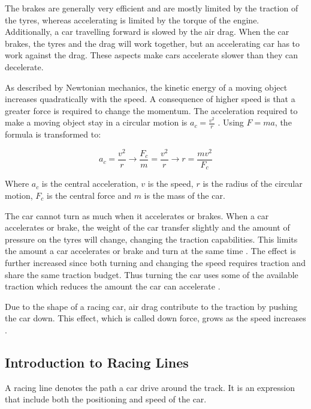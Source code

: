 The brakes are generally very efficient and are mostly limited by the traction of the tyres, whereas accelerating is limited by the torque of the engine. Additionally, a car travelling forward is slowed by the air drag. When the car brakes, the tyres and the drag will work together, but an accelerating car has to work against the drag. These aspects make cars accelerate slower than they can decelerate.

As described by Newtonian mechanics, the kinetic energy of a moving object increases quadratically with the speed. A consequence of higher speed is that a greater force is required to change the momentum. The acceleration required to make a moving object stay in a circular motion is \(a_c=\frac{v^2}{r}\)  \cite{beckman}. Using \(F=ma\), the formula is transformed to: 

\begin{equation}
\label{equation:turn_radius}
a_c = \frac{v^2}{r} 
\rightarrow
\frac{F_c}{m} = \frac{v^2}{r} 
\rightarrow
r = \frac{mv^2}{F_c}
\end{equation}

\noindent
Where $a_c$ is the central acceleration, $v$ is the speed, $r$ is the radius of the circular motion, $F_c$ is the central force and $m$ is the mass of the car. 

The car cannot turn as much when it accelerates or brakes. When a car accelerates or brake, the weight of the car transfer slightly and the amount of pressure on the tyres will change, changing the traction capabilities. This limits the amount a car accelerates or brake and turn at the same time \cite{beckman}. The effect is further increased since both turning and changing the speed requires traction and share the same traction budget. Thus turning the car uses some of the available traction which reduces the amount the car can accelerate \cite{beckman, edmondson}. 


Due to the shape of a racing car, air drag contribute to the traction by pushing the car down. This effect, which is called down force, grows as the speed increases \cite{beckman}.

\subsection{Introduction to Racing Lines}
\label{racing_theory:lines}
A racing line denotes the path a car drive around the track. It is an expression that include both the positioning and speed of the car.

